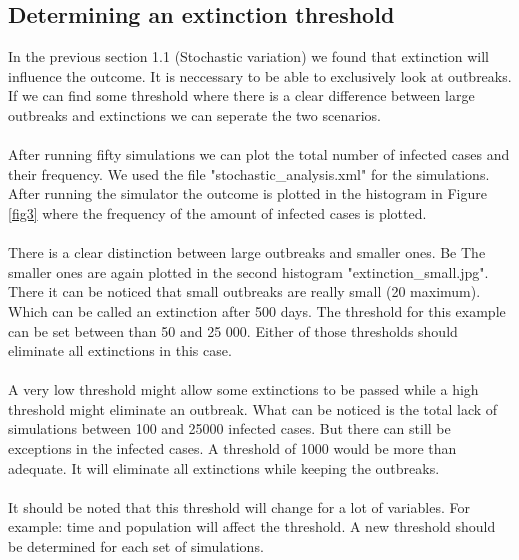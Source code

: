 \documentclass[runningheads]{llncs}
\begin{document}
	\subsection{Determining an extinction threshold}
	In the previous section 1.1 (Stochastic variation) we found that extinction will influence the outcome. It is neccessary to be able to exclusively look at outbreaks. If we can find some threshold where there is a clear difference between large outbreaks and extinctions we can seperate the two scenarios.\\ \\
	After running fifty simulations we can plot the total number of infected cases and their frequency.  We used the file "stochastic\_analysis.xml" for the simulations. After running the simulator the outcome is plotted in the histogram in Figure \ref{fig3} where the frequency of the amount of infected cases is plotted.\\ \\
	There is a clear distinction between large outbreaks and smaller ones. Be The smaller ones are again plotted in the second histogram "extinction\_small.jpg". There it can be noticed that small outbreaks are really small (20 maximum). Which can be called an extinction after 500 days. The threshold for this example can be set between than 50 and 25 000. Either of those thresholds should eliminate all extinctions in this case.\\ \\
	A very low threshold might allow some extinctions to be passed while a high threshold might eliminate an outbreak. What can be noticed is the total lack of simulations between 100 and 25000 infected cases. But there can still be exceptions in the infected cases. A threshold of 1000 would be more than adequate. It will eliminate all extinctions while keeping the outbreaks.\\ \\
	It should be noted that this threshold will change for a lot of variables. For example: time and population will affect the threshold. A new threshold should be determined for each set of simulations.
	
\end{document}
